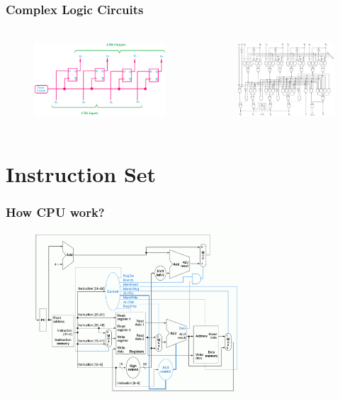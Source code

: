 \documentclass[xcolor={table, dvipsnames}]{beamer}
\begin{document}
\begin{frame}
\frametitle{Complex Logic Circuits}
\begin{columns}
\begin{figure}[h!]
  \includegraphics[height=3cm]{img/register.png}
\end{figure}
\begin{figure}[h!]
  \includegraphics[height=3cm]{img/alu.png}
\end{figure}
\end{columns}
\end{frame}

\section{Instruction Set}

\begin{frame}
\frametitle{How CPU work?}
\begin{figure}[h!]
  \includegraphics[height=6cm]{img/single_cycle_datapath.png}
\end{figure}

\end{frame}
\end{document}
